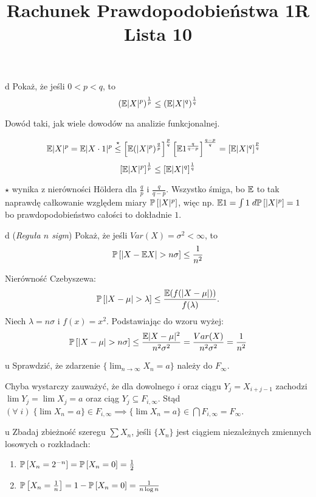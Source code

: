 \documentclass{article}
\title{Rachunek Prawdopodobieństwa 1R\\{\normalsize Lista 10}}
\author{}
\date{}
\begin{document}
\maketitle\thispagestyle{empty}

\begin{problem}{d}
  Pokaż, że jeśli $0<p<q$, to
  $$\left(\mathbb{E}|X|^p\right)^\frac{1}{p}\leq\left(\mathbb{E}|X|^q\right)^\frac{1}{q}$$
\end{problem}

Dowód taki, jak wiele dowodów na analizie funkcjonalnej.

\begin{align*}
  \mathbb{E}|X|^p&=\mathbb{E}|X\cdot 1|^p\overset{\star}{\leq} \left[\mathbb{E}(|X|^p)^\frac{q}{p}\right]^\frac{p}{q}\left[\mathbb{E}1^{\frac{q}{q-p}}\right]^\frac{q-p}{q}=\left[\mathbb{E}|X|^q\right]^\frac{p}{q}
\end{align*}
  $$\left[\mathbb{E}|X|^p\right]^\frac{1}{p}\leq \left[\mathbb{E}|X|^q\right]^\frac{1}{q}$$

  $\star$ wynika z nierówności H\"oldera dla $\frac{q}{p}$ i $\frac{q}{q-p}$. Wszystko śmiga, bo $\mathbb{E}$ to tak naprawdę całkowanie względem miary $\prob{|X|^p}$, więc np. $\e1=\int 1\;d\prob{|X|^p}=1$ bo prawdopodobieństwo całości to dokładnie $1$.

\begin{problem}{d}
  (\emph{Reguła $n$ sigm}) Pokaż, że jeśli $Var(X)=\sigma^2<\infty$, to
  $$\prob{|X-\e X|>n\sigma}\leq\frac{1}{n^2}$$
\end{problem}

Nierówność Czebyszewa:
$$\prob{|X-\mu|>\lambda}\leq\frac{\e(f(|X-\mu|))}{f(\lambda)}.$$
Niech $\lambda=n\sigma$ i $f(x)=x^2$. Podstawiając do wzoru wyżej:
$$\prob{|X-\mu|>n\sigma}\leq\frac{\e|X-\mu|^2}{n^2\sigma^2}=\frac{Var(X)}{n^2\sigma^2}=\frac{1}{n^2}$$

\begin{problem}{u}
  Sprawdzić, że zdarzenie $\{\lim_{n\to\infty}X_n=a\}$ należy do $F_\infty$.
\end{problem}

Chyba wystarczy zauważyć, że dla dowolnego $i$ oraz ciągu $Y_j=X_{i+j-1}$ zachodzi $\lim Y_j=\lim X_j=a$ oraz ciąg $Y_j\subseteq F_{i, \infty}$. Stąd $(\forall\;i)\;\{\lim X_n=a\}\in F_{i,\infty}\implies\{\lim X_n=a\}\in \bigcap F_{i,\infty}=F_\infty$.

\begin{problem}[5]{u}
  Zbadaj zbieżność szeregu $\sum X_n$, jeśli $\{X_n\}$ jest ciągiem niezależnych zmiennych losowych o rozkładach:

  \begin{enumerate}[label=(\alph*)]
    \item $\prob{X_n =2^{-n}}=\prob{X_n=0}=\frac12$
    \item $\prob{X_n=\frac{1}{n}}=1-\prob{X_n=0}=\frac{1}{n\log n}$
  \end{enumerate}
\end{problem}
\end{document}
